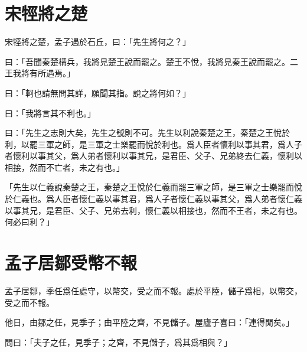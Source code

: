 \section{宋牼將之楚}

宋牼將之楚，孟子遇於石丘，曰：「先生將何之？」

曰：「吾聞秦楚構兵，我將見楚王說而罷之。楚王不悅，我將見秦王說而罷之。二王我將有所遇焉。」

曰：「軻也請無問其詳，願聞其指。說之將何如？」

曰：「我將言其不利也。」

曰：「先生之志則大矣，先生之號則不可。先生以利說秦楚之王，秦楚之王悅於利，以罷三軍之師，是三軍之士樂罷而悅於利也。爲人臣者懷利以事其君，爲人子者懷利以事其父，爲人弟者懷利以事其兄，是君臣、父子、兄弟終去仁義，懷利以相接，然而不亡者，未之有也。」

「先生以仁義說秦楚之王，秦楚之王悅於仁義而罷三軍之師，是三軍之士樂罷而悅於仁義也。爲人臣者懷仁義以事其君，爲人子者懷仁義以事其父，爲人弟者懷仁義以事其兄，是君臣、父子、兄弟去利，懷仁義以相接也，然而不王者，未之有也。何必曰利？」\par {}

\section{孟子居鄒受幣不報}

孟子居鄒，季任爲任處守，以幣交，受之而不報。處於平陸，儲子爲相，以幣交，受之而不報。

他日，由鄒之任，見季子；由平陸之齊，不見儲子。屋廬子喜曰：「連得閒矣。」

問曰：「夫子之任，見季子；之齊，不見儲子，爲其爲相與？」

